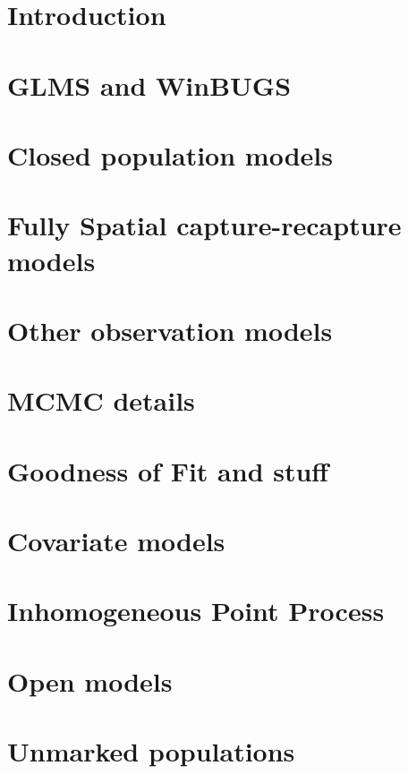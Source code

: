 \documentclass{book}
\begin{document}
\chapter{Introduction}
\label{chapt.intro}

\chapter{GLMS and WinBUGS}
\label{chapt.glms}

\chapter{Closed population models}
\label{chapt.closed}

\chapter{Fully Spatial capture-recapture models}
\label{chapt.scr0}

\chapter{Other observation models}
\label{chapt.poisson}

\chapter{MCMC details}
\label{chapt.mcmc}

\chapter{Goodness of Fit and stuff}
\label{chapt.gof}

\chapter{Covariate models}
\label{chapt.covariates}

\chapter{Inhomogeneous Point Process}
\label{chapt.ipp}

\chapter{Open models}
\label{chapt.open}


\chapter{Unmarked populations}
\label{chapt.unmarked}







\end{document}
